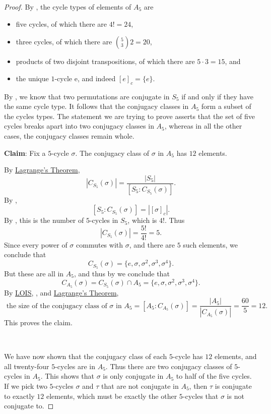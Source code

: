 \documentclass[12pt]{report}
\numberwithin{equation}{section}
\numberwithin{theorem}{chapter}
\theoremstyle{definition}
\newtheorem*{basic properties}{Basic Properties}
\newtheorem*{Important Remark}{Important Remark}
\newcommand{\s}{\sigma}
\begin{document}
\begin{proof}
By , the cycle types of elements of $A_5$ are
\begin{itemize}[itemsep=-0.1em]
\item five cycles, of which there are $4! = 24$, 
\item three cycles, of which there are ${5 \choose 3} 2 =   20$,
\item products of two disjoint transpositions, of which there are $5 \cdot 3 = 15$, and
\item the unique $1$-cycle e, and indeed $[e]_c = \{e\}$.
\end{itemize}

By , we know that two permutations are conjugate in $S_5$ if and only if they have the same cycle type. It follows that the conjugacy classes in $A_5$ form a subset of the cycles types.
The statement we are trying to prove asserts that the set of five cycles breaks apart into two conjugacy classes in $A_5$, whereas in all the other cases, the conjugacy classes remain whole. 



{\bf Claim}: Fix a $5$-cycle $\sigma$. The conjugacy class of $\sigma$ in $A_5$ has $12$ elements.


\vspace{0.5em}

\noindent
By \hyperref[Lagrange]{Lagrange's Theorem},
$$|C_{S_5}(\sigma)| = \frac{|S_5|}{[S_5 : C_{S_5}(\sigma)]}.$$
By , 
$$[S_5 : C_{S_5}(\sigma)] = |[\sigma]_c|.$$
By , this is the number of $5$-cycles in $S_5$, which is $4!$.
Thus
$$|C_{S_5}(\sigma)| = \frac{5!}{4!} = 5.$$
Since every power of $\sigma$ commutes with $\sigma$, and there are $5$ such elements, we conclude that
$$C_{S_5}(\sigma) = \{e, \sigma, \sigma^2, \sigma^3, \sigma^4\}.$$
But these are all in $A_5$, and thus by  we conclude that
$$C_{A_5}(\sigma) = C_{S_5}(\sigma) \cap A_5 = \{e, \sigma, \sigma^2, \sigma^3, \s^4\}.$$
By \hyperref[lois]{LOIS}, , and \hyperref[Lagrange]{Lagrange's Theorem}, 
$$\text{ the size of the conjugacy class of $\sigma$ in $A_5$} = [A_5: C_{A_5}(\sigma)] = \frac{|A_5|}{|C_{A_5}(\sigma)|} = \frac{60}{5} = 12.$$
This proves the claim.


\

We have now shown that the conjugacy class of each $5$-cycle has $12$ elements, and all twenty-four $5$-cycles are in $A_5$. Thus there are two conjugacy classes of $5$-cycles in $A_5$.
This shows that $\sigma$ is only conjugate in $A_5$ to half of the five cycles. 
If we pick two $5$-cycles $\sigma$ and $\tau$ that are not conjugate in $A_5$, then $\tau$ is conjugate to exactly $12$ elements, which must be exactly the other $5$-cycles that $\sigma$ is not conjugate to. 



\end{proof}
\end{document}
